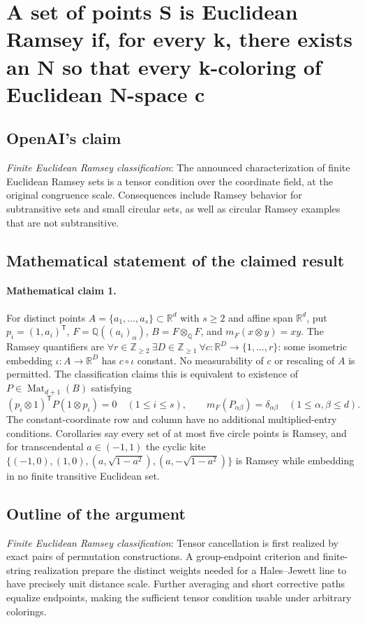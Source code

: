 \documentclass[11pt]{article}
\begin{document}
\section*{A set of points S is Euclidean Ramsey if, for every k, there exists an N so that every k-coloring of Euclidean N-space c}

\subsection{OpenAI's claim}
\textit{Finite Euclidean Ramsey classification}: The announced characterization of finite Euclidean Ramsey sets is a tensor condition over the coordinate field, at the original congruence scale. Consequences include Ramsey behavior for subtransitive sets and small circular sets, as well as circular Ramsey examples that are not subtransitive.

\subsection{Mathematical statement of the claimed result}
\paragraph{Mathematical claim 1.} For distinct points $A=\{a_1,\ldots,a_s\}\subset\mathbb R^d$ with $s\ge2$ and affine span $\mathbb R^d$, put $p_i=(1,a_i)^{\mathsf T}$, $F=\mathbb Q((a_i)_\alpha)$, $B=F\otimes_{\mathbb Q}F$, and $m_F(x\otimes y)=xy$. The Ramsey quantifiers are $\forall r\in\mathbb Z_{\ge2}\ \exists D\in\mathbb Z_{\ge1}\ \forall c:\mathbb R^D\to\{1,\ldots,r\}$: some isometric embedding $\iota:A\to\mathbb R^D$ has $c\circ\iota$ constant. No measurability of $c$ or rescaling of $A$ is permitted. The classification claims this is equivalent to existence of $P\in\operatorname{Mat}_{d+1}(B)$ satisfying \[(p_i\otimes1)^{\mathsf T}P(1\otimes p_i)=0\quad(1\le i\le s),\qquad m_F(P_{\alpha\beta})=\delta_{\alpha\beta}\quad(1\le\alpha,\beta\le d).\] The constant-coordinate row and column have no additional multiplied-entry conditions. Corollaries say every set of at most five circle points is Ramsey, and for transcendental $a\in(-1,1)$ the cyclic kite $\{(-1,0),(1,0),(a,\sqrt{1-a^2}),(a,-\sqrt{1-a^2})\}$ is Ramsey while embedding in no finite transitive Euclidean set.

\subsection{Outline of the argument}
\textit{Finite Euclidean Ramsey classification}: Tensor cancellation is first realized by exact pairs of permutation constructions. A group-endpoint criterion and finite-string realization prepare the distinct weights needed for a Hales--Jewett line to have precisely unit distance scale. Further averaging and short corrective paths equalize endpoints, making the sufficient tensor condition usable under arbitrary colorings.
\end{document}
